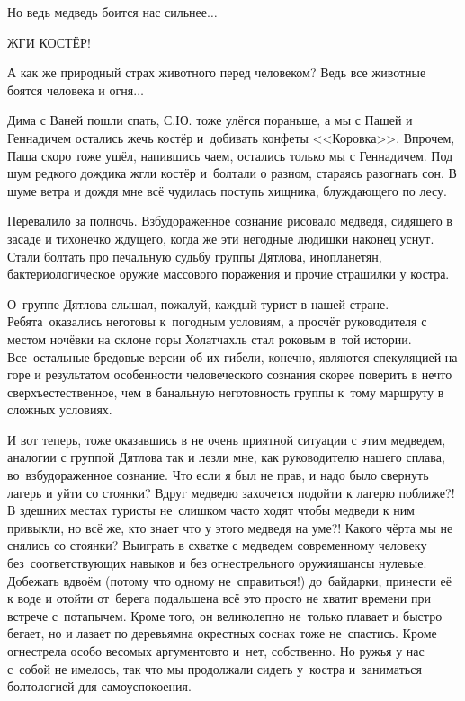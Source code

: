 \diagdash Но ведь медведь боится нас сильнее$\ldots$  

\diagdash ЖГИ КОСТЁР! 

\diagdash А как же природный страх животного перед человеком? Ведь все животные боятся человека и огня$\ldots$  


Дима с Ваней пошли спать, С.Ю. тоже улёгся пораньше, а мы с Пашей и Геннадичем остались жечь костёр и~добивать конфеты <<Коровка>>. Впрочем, Паша скоро тоже ушёл, напившись чаем, остались только мы с Геннадичем. Под шум редкого дождика жгли костёр и~болтали о разном, стараясь разогнать сон. В шуме ветра и дождя мне всё чудилась поступь хищника, блуждающего по лесу. 

Перевалило за полночь. Взбудораженное сознание рисовало медведя, сидящего в засаде и тихонечко ждущего, когда же эти негодные людишки наконец уснут. Стали болтать про печальную судьбу группы Дятлова, инопланетян, бактериологическое оружие массового поражения и прочие страшилки у костра. 

О~группе Дятлова слышал, пожалуй, каждый турист в нашей стране. Ребята~оказались неготовы к~погодным условиям, а просчёт руководителя с местом ночёвки на склоне горы Холатчахль стал роковым в~той истории. Все~остальные бредовые версии об их гибели, конечно, являются спекуляцией на горе и результатом особенности человеческого сознания скорее поверить в нечто сверхъестественное, чем в банальную неготовность группы к~тому маршруту в сложных условиях. 

И вот теперь, тоже оказавшись в не очень приятной ситуации с этим медведем, аналогии с группой Дятлова так и лезли мне, как руководителю нашего сплава, во~взбудораженное сознание. Что если я был не прав, и надо было свернуть лагерь и уйти со стоянки? Вдруг медведю захочется подойти к лагерю поближе?! В здешних местах туристы не~слишком часто ходят чтобы медведи к ним привыкли, но всё же, кто знает что у этого медведя на уме?! Какого чёрта мы не снялись со стоянки? Выиграть в схватке с медведем современному человеку без~соответствующих навыков и без огнестрельного оружия\mdash шансы нулевые. Добежать вдвоём (потому что одному не~справиться!) до~байдарки, принести её к воде и отойти от~берега подальше\mdash на всё это просто не хватит времени при встрече с~потапычем. Кроме того, он великолепно не~только плавает и быстро бегает, но и лазает по деревьям\mdash на окрестных соснах тоже не~спастись. Кроме огнестрела особо весомых аргументов\sdash то и~нет, собственно. Но ружья у нас с~собой не имелось, так что мы продолжали сидеть у~костра и~заниматься болтологией для самоуспокоения.


